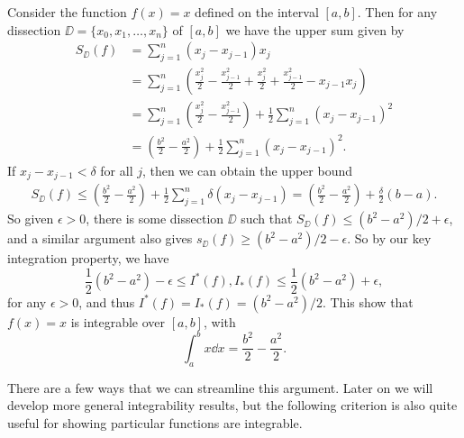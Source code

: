 \begin{example}[$f(x) = x$ is Integrable]
	Consider the function $f(x) = x$ defined on the interval $[a, b]$. Then for any dissection $\DD = \{x_0, x_1, \dots, x_n\}$ of $[a, b]$ we have the upper sum given by
	\begin{align*}
		S_{\DD}(f) &= \sum_{j = 1}^{n} (x_j - x_{j - 1}) x_j \\
				&= \sum_{j = 1}^n \left(\frac{x_j^2}{2} - \frac{x_{j - 1}^2}{2}+ \frac{x_j^2}{2} + \frac{x_{j-1}^2}{2}- x_{j - 1}x_j\right) \\
				&= \sum_{j = 1}^n \left(\frac{x_j^2}{2} - \frac{x_{j - 1}^2}{2}\right) +\frac{1}{2} \sum_{j = 1}^{n}\left(x_j - x_{j - 1}\right)^2 \\
				&= \left(\frac{b^2}{2} - \frac{a^2}{2}\right) +\frac{1}{2} \sum_{j = 1}^{n}\left(x_j - x_{j - 1}\right)^2.
	\end{align*}
	If $x_{j} - x_{j - 1} < \delta$ for all $j$, then we can obtain the upper bound
	\begin{align*}
		S_{\DD}(f) \leq \left(\frac{b^2}{2} - \frac{a^2}{2}\right) +\frac{1}{2} \sum_{j = 1}^{n}\delta\left(x_j - x_{j - 1}\right) = \left(\frac{b^2}{2} - \frac{a^2}{2}\right) + \frac{\delta}{2}(b - a).
	\end{align*}
	So given $\epsilon > 0$, there is some dissection $\DD$ such that $S_{\DD}(f) \leq (b^2 - a^2)/2 + \epsilon$, and a similar argument also gives $s_{\DD}(f) \geq (b^2 - a^2)/2 - \epsilon$. So by our key integration property, we have
	$$
	\frac{1}{2}(b^2 - a^2) - \epsilon \leq I^*(f), I_*(f) \leq \frac{1}{2}(b^2 - a^2) + \epsilon,
	$$
	for any $\epsilon > 0$, and thus $I^*(f) = I_*(f) = (b^2 - a^2)/2$. This show that $f(x) = x$ is integrable over $[a, b]$, with
	$$
	\int_a^b x \dd x = \frac{b^2}{2} - \frac{a^2}{2}.
	$$
\end{example}

There are a few ways that we can streamline this argument. Later on we will develop more general integrability results, but the following criterion is also quite useful for showing particular functions are integrable.

